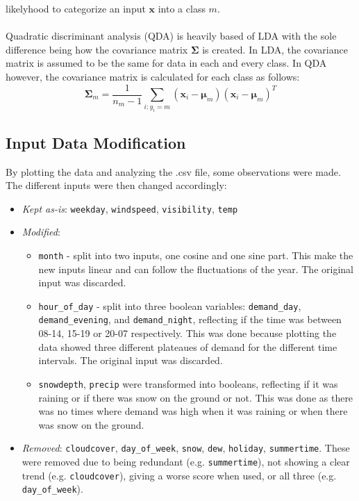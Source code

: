 likelyhood to categorize an input $\mathbf{x}$ into a class $m$.
\\
\\
Quadratic discriminant analysis (QDA) is heavily based of LDA with the sole difference being how the covariance matrix 
$\mathbf{\Sigma}$ is created.
In LDA, the covariance matrix is assumed to be the same for data in each and every class. In QDA however,
the covariance matrix is calculated for each class as follows:
\begin{equation*}
    \mathbf{\Sigma}_m = \frac{1}{n_m - 1} \sum_{i:y_i=m} 
    (\mathbf{x}_i-\mathbf{\mu}_m)(\mathbf{x}_i-\mathbf{\mu}_m)^T
\end{equation*}







\subsection{Input Data Modification}
\label{sec:input data modification}
By plotting the data and analyzing the .csv file, some observations were made. The different inputs were then changed accordingly:
\begin{itemize}
    \item \emph{Kept as-is}: \texttt{weekday}, \texttt{windspeed}, \texttt{visibility}, \texttt{temp}
    \item \emph{Modified}:
    \begin{itemize}
        \item \texttt{month} - split into two inputs, one cosine and one sine part. This make the new inputs linear and can follow the fluctuations of the year. The original input was discarded.
        \item \texttt{hour\_of\_day} - split into three boolean variables: \texttt{demand\_day}, \texttt{demand\_evening}, and \texttt{demand\_night}, reflecting if the time was between 08-14, 15-19 or 20-07 respectively. This was done because plotting the data showed three different plateaues of demand for the different time intervals. The original input was discarded.
        \item \texttt{snowdepth}, \texttt{precip} were transformed into booleans, reflecting if it was raining or if there was snow on the ground or not. This was done as there was no times where demand was high when it was raining or when there was snow on the ground.
    \end{itemize} 
    \item \emph{Removed}: \texttt{cloudcover}, \texttt{day\_of\_week}, \texttt{snow}, \texttt{dew}, \texttt{holiday}, \texttt{summertime}. These were removed due to being redundant (e.g. \texttt{summertime}), not showing a clear trend (e.g. \texttt{cloudcover}), giving a worse score when used, or all three (e.g. \texttt{day\_of\_week}).
\end{itemize}